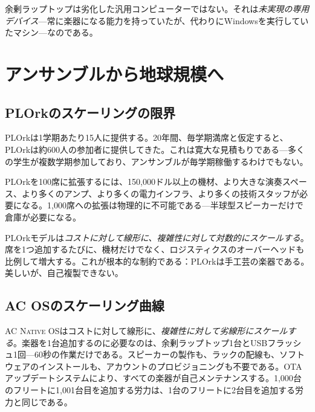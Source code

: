 \documentclass[10pt,letterpaper,twocolumn]{article}
\newcommand{\acos}{\textsc{AC Native OS}}
\begin{document}
余剰ラップトップは劣化した汎用コンピューターではない。それは\emph{未実現の専用デバイス}---常に楽器になる能力を持っていたが、代わりにWindowsを実行していたマシン---なのである。


\section{アンサンブルから地球規模へ}
\label{sec:scaling}

\subsection{PLOrkのスケーリングの限界}

PLOrkは1学期あたり15人に提供する。20年間、毎学期満席と仮定すると、PLOrkは約600人の参加者に提供してきた。これは寛大な見積もりである---多くの学生が複数学期参加しており、アンサンブルが毎学期稼働するわけでもない。

PLOrkを100席に拡張するには、150,000ドル以上の機材、より大きな演奏スペース、より多くのアンプ、より多くの電力インフラ、より多くの技術スタッフが必要になる。1,000席への拡張は物理的に不可能である---半球型スピーカーだけで倉庫が必要になる。

PLOrkモデルは\emph{コストに対して線形に、複雑性に対して対数的にスケールする}。席を1つ追加するたびに、機材だけでなく、ロジスティクスのオーバーヘッドも比例して増大する。これが根本的な制約である：PLOrkは手工芸の楽器である。美しいが、自己複製できない。

\subsection{AC OSのスケーリング曲線}

\acos{}はコストに対して線形に、\emph{複雑性に対して劣線形にスケールする}。楽器を1台追加するのに必要なのは、余剰ラップトップ1台とUSBフラッシュ1回---60秒の作業だけである。スピーカーの製作も、ラックの配線も、ソフトウェアのインストールも、アカウントのプロビジョニングも不要である。OTAアップデートシステムにより、すべての楽器が自己メンテナンスする。1,000台のフリートに1,001台目を追加する労力は、1台のフリートに2台目を追加する労力と同じである。
\end{document}

